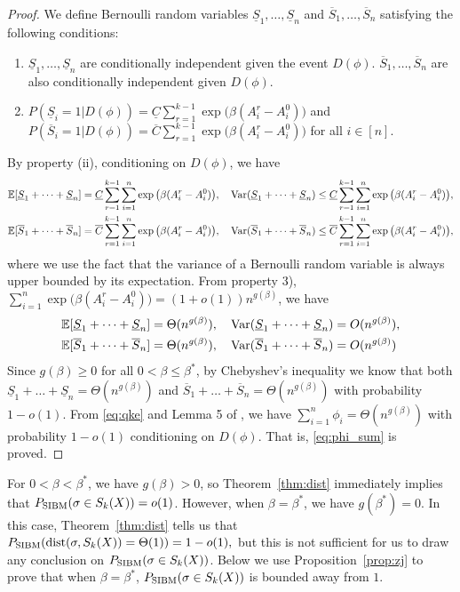 \documentclass{article}
\begin{document}
\begin{proof}
		
	We define Bernoulli random variables $\underline{S}_1,\dots, \underline{S}_n$ and $\overline{S}_1,\dots,\overline{S}_n$ satisfying the following conditions:
	\begin{enumerate}[label=(\roman*)]
		\item $\underline{S}_1,\dots, \underline{S}_n$ are conditionally independent given the event $D(\phi)$.
		$\overline{S}_1,\dots,\overline{S}_n$ are also conditionally independent given $D(\phi)$.
		\item $P(\underline{S}_i=1 | D(\phi)) =\underline{C}
		\sum_{r=1}^{k-1}\exp\big(\beta (A^r_i-A^0_i) \big)$ and $P(\overline{S}_i=1 | D(\phi)) =\overline{C}
		\sum_{r=1}^{k-1}\exp\big(\beta (A^r_i-A^0_i) \big)$ for all $i\in[n]$.
	\end{enumerate}
	By property (ii), conditioning on $D(\phi)$, we have
	\begin{align*}
	& \mathbb{E}[\underline{S}_1 + \dots + \underline{S}_n] = \underline{C}
	\sum_{r=1}^{k-1}\sum_{i=1}^n \exp\big(\beta (A^r_i-A^0_i) \big) , \quad
	\operatorname{Var}(\underline{S}_1 + \dots + \underline{S}_n) \le \underline{C}
	\sum_{r=1}^{k-1}\sum_{i=1}^n \exp\big(\beta (A^r_i-A^0_i) \big)
	, \\
	& \mathbb{E}[\overline{S}_1 + \dots + \overline{S}_n] = \overline{C}
	\sum_{r=1}^{k-1}\sum_{i=1}^n \exp\big(\beta (A^r_i-A^0_i) \big) , \quad
	\operatorname{Var}(\overline{S}_1 + \dots + \overline{S}_n) \le \overline{C}
	\sum_{r=1}^{k-1}\sum_{i=1}^n \exp\big(\beta (A^r_i-A^0_i) \big) ,
	\end{align*}
	where we use the fact that the variance of a Bernoulli random variable is always upper bounded by its expectation.
	From property 3), $\sum_{i=1}^n \exp\big(\beta (A^r_i-A^0_i) \big) = (1+o(1))n^{g(\beta)}$,
	we have 
	\begin{align*}
	& \mathbb{E}[\underline{S}_1 + \dots + \underline{S}_n] = \Theta(n^{g(\beta)}) , \quad
	\operatorname{Var}(\underline{S}_1 + \dots + \underline{S}_n) = O(n^{g(\beta)}) , \\
	& \mathbb{E}[\overline{S}_1 + \dots + \overline{S}_n] = \Theta(n^{g(\beta)}) , \quad
	\operatorname{Var}(\overline{S}_1 + \dots + \overline{S}_n) = O(n^{g(\beta)}) 
	\end{align*}
	Since $g(\beta)\ge 0$ for all $0<\beta\le \beta^\ast$, by Chebyshev's inequality we know that both $\underline{S}_1 + \dots + \underline{S}_n=\Theta(n^{g(\beta)})$ and $\overline{S}_1 + \dots + \overline{S}_n=\Theta(n^{g(\beta)})$ with probability $1-o(1)$.
	From \eqref{eq:qke} and Lemma 5 of \cite{ye2020exact},
	we have $\sum_{i=1}^n \phi_i = \Theta(n^{g(\beta)})$ with probability $1-o(1)$ conditioning on
	$D(\phi)$. That is, \eqref{eq:phi_sum} is proved.

\end{proof}
For $0<\beta<\beta^\ast$, we have $g(\beta)>0$, so Theorem~\ref{thm:dist} immediately implies that $P_{\operatorname{SIBM}}(\sigma \in S_k(X))=o(1)$. However, when $\beta=\beta^\ast$, we have $g(\beta^\ast)=0$. In this case, Theorem~\ref{thm:dist} tells us that
$
P_{\operatorname{SIBM}}(\operatorname{dist}(\sigma, S_k(X)) = \Theta(1) ) = 1-o(1) ,
$
but this is not sufficient for us to draw any conclusion on $P_{\operatorname{SIBM}}(\sigma \in S_k(X))$.
Below we use Proposition~\ref{prop:zj} to prove that when $\beta=\beta^\ast$, $P_{\operatorname{SIBM}}(\sigma \in S_k(X))$ is bounded away from $1$.
\end{document}
